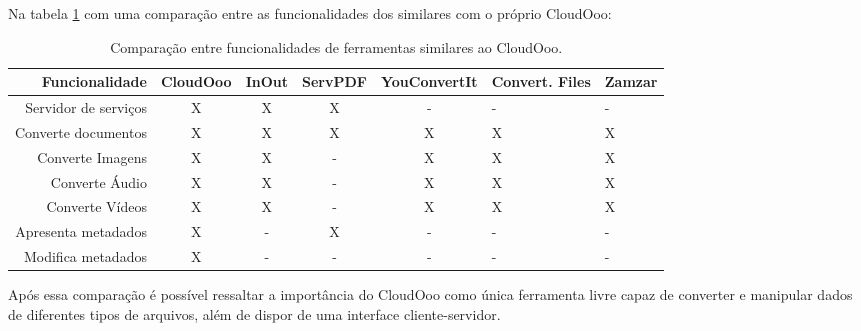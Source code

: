 Na tabela \ref{funsim} com uma comparação entre as funcionalidades dos similares com o próprio CloudOoo:
\begin{table}[!h]
\caption{Comparação entre funcionalidades de ferramentas similares ao CloudOoo.}
\label{funsim}
\begin{tabular}{|r|c|c|c|c|p{1.5cm}|p{1.5cm}|}
\hline
Funcionalidade & CloudOoo & InOut & ServPDF & YouConvertIt & Convert. Files & Zamzar \\
\hline
Servidor de serviços & X & X & X & - & - & - \\
\hline
Converte documentos & X & X & X & X & X & X \\
\hline
Converte Imagens & X & X & - & X & X & X \\
\hline
Converte Áudio & X & X & - & X & X & X \\
\hline
Converte Vídeos & X & X & - & X & X & X \\
\hline
Apresenta metadados & X & - & X & - & - & - \\
\hline
Modifica metadados & X & - & - & - & - & - \\
\hline
\end{tabular} 
\end{table}

Após essa comparação é possível ressaltar a importância do CloudOoo como única ferramenta livre capaz de converter e manipular dados de diferentes tipos de arquivos, além de dispor de uma interface cliente-servidor.
